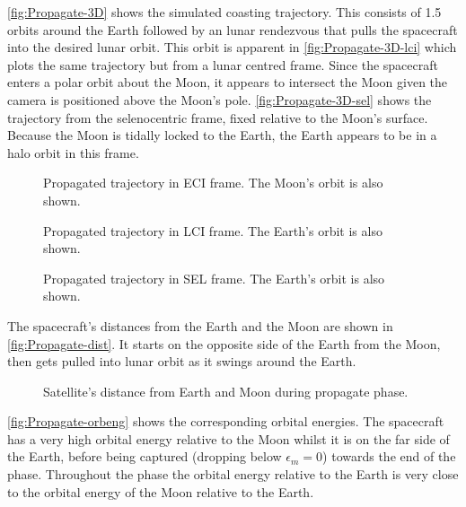 \autoref{fig:Propagate-3D} shows the simulated coasting trajectory. This consists of 1.5 orbits around the Earth followed by an lunar rendezvous that pulls the spacecraft into the desired lunar orbit. This orbit is apparent in \autoref{fig:Propagate-3D-lci} which plots the same trajectory but from a lunar centred frame. Since the spacecraft enters a polar orbit about the Moon, it appears to intersect the Moon given the camera is positioned above the Moon's pole. \autoref{fig:Propagate-3D-sel} shows the trajectory from the selenocentric frame, fixed relative to the Moon's surface. Because the Moon is tidally locked to the Earth, the Earth appears to be in a halo orbit in this frame.

\begin{figure}
\caption{Propagated trajectory in ECI frame. The Moon's orbit is also shown.}
\label{fig:Propagate-3D}
\centering
\def\svgwidth{\figurewidth}

\end{figure}

\begin{figure}
\caption{Propagated trajectory in LCI frame. The Earth's orbit is also shown.}
\label{fig:Propagate-3D-lci}
\centering
\def\svgwidth{\figurewidth}

\end{figure}

\begin{figure}
\caption{Propagated trajectory in SEL frame. The Earth's orbit is also shown.}
\label{fig:Propagate-3D-sel}
\centering
\def\svgwidth{\figurewidth}

\end{figure}

The spacecraft's distances from the Earth and the Moon are shown in \autoref{fig:Propagate-dist}. It starts on the opposite side of the Earth from the Moon, then gets pulled into lunar orbit as it swings around the Earth. 

\begin{figure}
\caption{Satellite's distance from Earth and Moon during propagate phase.}
\label{fig:Propagate-dist}
\centering
\def\svgwidth{\figurewidth}

\end{figure}

\autoref{fig:Propagate-orbeng} shows the corresponding orbital energies. The spacecraft has a very high orbital energy relative to the Moon whilst it is on the far side of the Earth, before being captured (dropping below $\epsilon_m=0$) towards the end of the phase. Throughout the phase the orbital energy relative to the Earth is very close to the orbital energy of the Moon relative to the Earth.

